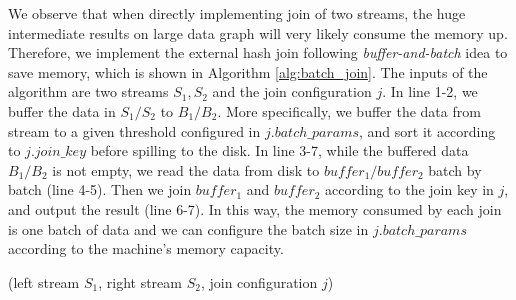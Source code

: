  We observe that when directly implementing join of two streams, the huge intermediate results on large data graph will very likely consume the memory up. Therefore, we implement the external hash join following \textit{buffer-and-batch} idea to save memory, which is shown in Algorithm \ref{alg:batch_join}. The inputs of the algorithm are two streams $S_1, S_2$ and the join configuration $j$. In line 1-2, we buffer the data in $S_1/S_2$ to $B_1/B_2$. More specifically, we buffer the data from stream to a given threshold configured in $j.batch\_params$, and sort it according to $j.join\_key$ before spilling to the disk. In line 3-7, while the buffered data $B_1/B_2$ is not empty, we read the data from disk to $buffer_1/buffer_2$ batch by batch (line 4-5). Then we join $buffer_1$ and $buffer_2$ according to the join key in $j$, and output the result (line 6-7). In this way, the memory consumed by each join is one batch of data and we can configure the batch size in $j.batch\_params$ according to the machine's memory capacity. 


\begin{algorithm}[htb]
\SetAlgoVlined
{}
\small
\caption{(left stream $S_1$, right stream $S_2$, join configuration $j$)}
\label{alg:batch_join}
\\
\\
\end{algorithm}